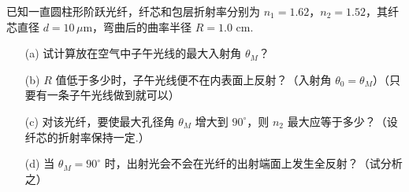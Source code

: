 \documentclass{assignment}
\begin{document}
\begin{prob}
    已知一直圆柱形阶跃光纤，纤芯和包层折射率分别为 $n_1=1.62$，$n_2=1.52$，其纤芯直径 $d=10\,\mu$m，弯曲后的曲率半径 $R=1.0$ cm.
    \begin{itemize}
        \item[(a)] 试计算放在空气中子午光线的最大入射角 $\theta_M$？
        \item[(b)] $R$ 值低于多少时，子午光线便不在内表面上反射？（入射角 $\theta_0=\theta_M$）（只要有一条子午光线做到就可以）
        \item[(c)] 对该光纤，要使最大孔径角 $\theta_M$ 增大到 $90^{\circ}$，则 $n_2$ 最大应等于多少？（设纤芯的折射率保持一定.）
        \item[(d)] 当 $\theta_M=90^{\circ}$ 时，出射光会不会在光纤的出射端面上发生全反射？（试分析之）
    \end{itemize}
\end{prob}
\end{document}
